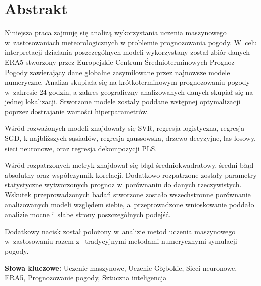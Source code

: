 \documentclass{article}
\begin{document}

\begin{titlepage}
    
\end{titlepage}

\clearpage%
\let\clearpage\relax%
\vspace*{-2cm}%

\tableofcontents
\pagebreak

\section*{Abstrakt}

Niniejsza praca zajmuję się analizą wykorzystania uczenia maszynowego w~zastosowaniach meteorologicznych
w problemie prognozowania pogody. W~celu interpretacji działania poszczególnych modeli wykorzystany został
zbiór danych ERA5 stworzony przez Europejskie Centrum Średnioterminowych Prognoz Pogody zawierający
dane globalne zasymilowane przez najnowsze modele numeryczne. Analiza skupiała 
się na krótkoterminowym prognozowaniu pogody w~zakresie 24 godzin,
a zakres geograficzny analizowanych danych skupiał się na jednej lokalizacji. 
Stworzone modele zostały poddane wstępnej optymalizacji poprzez dostrajanie wartości hiperparametrów.

Wśród rozważonych modeli znajdowały się SVR, regresja logistyczna, regresja SGD,
k najbliższych sąsiadów, regresja gaussowska, drzewo decyzyjne, las losowy, sieci neuronowe,
oraz regresja dekompozycji PLS.

Wśród rozpatrzonych metryk znajdował się błąd średniokwadratowy, średni błąd absolutny oraz współczynnik
korelacji. Dodatkowo rozpatrzone zostały parametry statystyczne wytworzonych prognoz w~porównaniu
do danych rzeczywistych. Wskutek przeprowadzonych badań stworzone zostało wszechstronne porównanie
analizowanych modeli względem siebie, a~przeprowadzone wnioskowanie poddało analizie 
mocne i~słabe strony poszczególnych podejść.

Dodatkowy nacisk został położony w~analizie metod uczenia maszynowego w~zastosowaniu razem z~
tradycyjnymi metodami numerycznymi symulacji pogody. 

\bigskip

\noindent
{\bf Słowa kluczowe:} Uczenie maszynowe, Uczenie Głębokie, Sieci neuronowe,
ERA5, Prognozowanie pogody, Sztuczna inteligencja
\pagebreak



% 



% 

\end{document}

